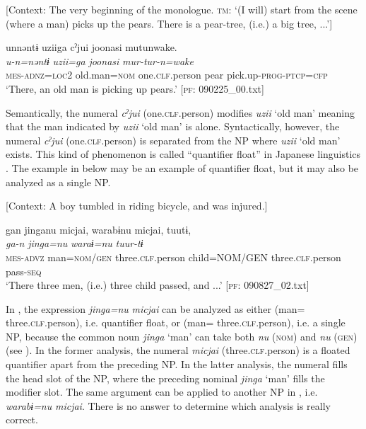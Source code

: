 [Context: The very beginning of the monologue. \textsc{tm}: ‘(I will) start from the scene (where a man) picks up the pears. There is a pear-tree, (i.e.) a big tree, ...’]

{\TM}
\glll unnəntɨ  uziiga  cˀjui  joonasi   mutunwake.\\
\textit{u-n=nəntɨ}  \textit{uzii=ga}  \textit{}  \textit{joonasi} \textit{mur-tur-n=wake}\\
    \textsc{mes}-\textsc{adnz}=\textsc{loc}2  old.man=\textsc{nom}  one.\textsc{clf}.person  pear  pick.up-\textsc{prog}-\textsc{ptcp}=\textsc{cfp}\\
\glt    ‘There, an old man is picking up pears.’ [\textsc{pf}: 090225\_00.txt]

\z

Semantically, the numeral \textit{cˀjui} (one.\textsc{clf}.person) modifies \textit{uzii} ‘old man’ meaning that the man indicated by \textit{uzii} ‘old man’ is alone. Syntactically, however, the numeral \textit{cˀjui} (one.\textsc{clf}.person) is separated from the NP where \textit{uzii} ‘old man’ exists. This kind of phenomenon is called “quantifier float” in Japanese linguistics \citep[286]{Shibatani1990}. The example in  below may be an example of quantifier float, but it may also be analyzed as a single NP.

\ea \label{ex:7:17}  [Context: A boy tumbled in riding bicycle, and was injured.]

{\TM}
\glll gan  jinganu  micjai,  warabɨnu  micjai,  tuutɨ,\\
\textit{ga-n}  \textit{jinga=nu}  \textit{}  \textit{waraɨ=nu} \textit{}  \textit{tuur-tɨ}\\
    \textsc{mes}-\textsc{advz}  man=\textsc{nom}/\textsc{gen}  three.\textsc{clf}.person  child=NOM/GEN   three.\textsc{clf}.person  pass-\textsc{seq}\\
\glt    ‘There three men, (i.e.) three child passed, and ...’ [\textsc{pf}: 090827\_02.txt]

\z

In , the expression \textit{jinga=nu} \textit{micjai} can be analyzed as either (man= three.\textsc{clf}.person), i.e. quantifier float, or (man= three.\textsc{clf}.person), i.e. a single NP, because the common noun \textit{jinga} ‘man’ can take both \textit{nu} (\textsc{nom}) and \textit{nu} (\textsc{gen}) (see ). In the former analysis, the numeral \textit{micjai} (three.\textsc{clf}.person) is a floated quantifier apart from the preceding NP. In the latter analysis, the numeral fills the head slot of the NP, where the preceding nominal \textit{jinga} ‘man’ fills the modifier slot. The same argument can be applied to another NP in , i.e. \textit{warabɨ=nu} \textit{micjai}. There is no answer to determine which analysis is really correct.

